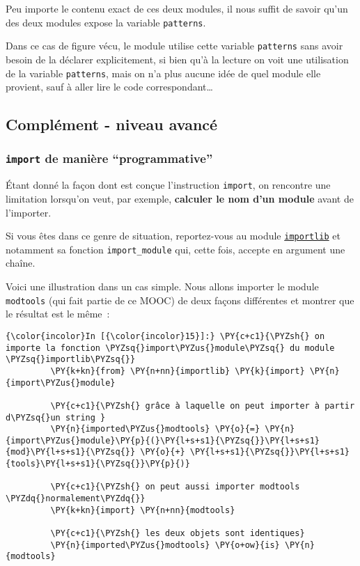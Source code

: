 Peu importe le contenu exact de ces deux modules, il nous suffit de
savoir qu'un des deux modules expose la variable \texttt{patterns}.

Dans ce cas de figure vécu, le module utilise cette variable
\texttt{patterns} sans avoir besoin de la déclarer explicitement, si
bien qu'à la lecture on voit une utilisation de la variable
\texttt{patterns}, mais on n'a plus aucune idée de quel module elle
provient, sauf à aller lire le code correspondant\ldots{}

    \hypertarget{compluxe9ment---niveau-avancuxe9}{%
\subsection{Complément - niveau
avancé}\label{compluxe9ment---niveau-avancuxe9}}

    \hypertarget{import-de-maniuxe8re-programmative}{%
\subsubsection{\texorpdfstring{\texttt{import} de manière
``programmative''}{import de manière ``programmative''}}\label{import-de-maniuxe8re-programmative}}

    Étant donné la façon dont est conçue l'instruction \texttt{import}, on
rencontre une limitation lorsqu'on veut, par exemple, \textbf{calculer
le nom d'un module} avant de l'importer.

Si vous êtes dans ce genre de situation, reportez-vous au module
\href{https://docs.python.org/3/library/importlib.html}{\texttt{importlib}}
et notamment sa fonction \texttt{import\_module} qui, cette fois,
accepte en argument une chaîne.

    Voici une illustration dans un cas simple. Nous allons importer le
module \texttt{modtools} (qui fait partie de ce MOOC) de deux façons
différentes et montrer que le résultat est le même~:

    \begin{Verbatim}[commandchars=\\\{\},frame=single,framerule=0.3mm,rulecolor=\color{cellframecolor}]
{\color{incolor}In [{\color{incolor}15}]:} \PY{c+c1}{\PYZsh{} on importe la fonction \PYZsq{}import\PYZus{}module\PYZsq{} du module \PYZsq{}importlib\PYZsq{}}
         \PY{k+kn}{from} \PY{n+nn}{importlib} \PY{k}{import} \PY{n}{import\PYZus{}module}
         
         \PY{c+c1}{\PYZsh{} grâce à laquelle on peut importer à partir d\PYZsq{}un string }
         \PY{n}{imported\PYZus{}modtools} \PY{o}{=} \PY{n}{import\PYZus{}module}\PY{p}{(}\PY{l+s+s1}{\PYZsq{}}\PY{l+s+s1}{mod}\PY{l+s+s1}{\PYZsq{}} \PY{o}{+} \PY{l+s+s1}{\PYZsq{}}\PY{l+s+s1}{tools}\PY{l+s+s1}{\PYZsq{}}\PY{p}{)}
         
         \PY{c+c1}{\PYZsh{} on peut aussi importer modtools \PYZdq{}normalement\PYZdq{}}
         \PY{k+kn}{import} \PY{n+nn}{modtools}
         
         \PY{c+c1}{\PYZsh{} les deux objets sont identiques}
         \PY{n}{imported\PYZus{}modtools} \PY{o+ow}{is} \PY{n}{modtools}
\end{Verbatim}


